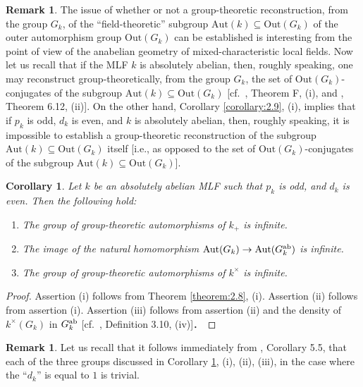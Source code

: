 \documentclass[11pt,showkeys]{article}
\theoremstyle{theorem}
\newtheorem{corollary}[theorem]{Corollary}
\theoremstyle{definition}
\newtheorem{remark}[theorem]{Remark}
\begin{document}
\begin{remark}\label{remark:2.11}
The issue of whether or not a group-theoretic 
reconstruction, from the group $G_k$, of the 
``field-theoretic'' subgroup $\mathrm{Aut}(k) \subseteq 
\mathrm{Out}(G_k)$ of the outer automorphism group 
$\mathrm{Out}(G_k)$ can be established is interesting 
from the point of view of the anabelian geometry of 
mixed-characteristic local fields.  Now let us recall 
that if the MLF $k$ is absolutely abelian, then, roughly 
speaking, one may reconstruct group-theoretically, from 
the group $G_k$, the set of $\mathrm{Out}(G_k)$-conjugates 
of the subgroup $\mathrm{Aut}(k) \subseteq 
\mathrm{Out}(G_k)$ [cf.\ \cite{Hoshi2}, Theorem F, (i), and 
\cite{Hoshi2}, Theorem 6.12, (ii)].  
On the other hand, Corollary \ref{corollary:2.9}, (i), implies that if 
$p_k$ is odd, $d_k$ is even, and $k$ is absolutely abelian, 
then, roughly speaking, it is impossible to establish a 
group-theoretic reconstruction of the subgroup 
$\mathrm{Aut}(k) \subseteq \mathrm{Out}(G_k)$ itself [i.e., 
as opposed to the set of $\mathrm{Out}(G_k)$-conjugates of the 
subgroup $\mathrm{Aut}(k) \subseteq \mathrm{Out}(G_k)$]. 
\end{remark}

\begin{corollary}\label{corollary:2.12}
Let $k$ be an absolutely abelian MLF such that $p_k$ is odd, and $d_k$ is even. Then the following hold: 
   \begin{enumerate}[label=(\arabic*),ref=(\arabic*)]
   	\item[\rm (i)] The group of group-theoretic automorphisms of $k_+$ is infinite. \label{colloraly:2.12:statement:1}
   	\item[\rm (ii)] The image of the natural homomorphism ${\rm Aut}(G_k) \to {\rm Aut}(G_k^{\rm ab})$ is infinite. \label{corollary:2.12:statement:2}
   	\item[\rm (iii)] The group of group-theoretic automorphisms of $k^\times$ is infinite. \label{corollary:2.12:statement:3}    
   \end{enumerate}
\end{corollary}
\begin{proof}
Assertion (i) follows from Theorem \ref{theorem:2.8}, (i). 
Assertion (ii) follows from assertion (i). 
Assertion (iii) follows from assertion (ii) and  the density of $k^\times(G_k)$ in $G_k^{\rm ab}$ [cf.\ \cite{Hoshi1}, Definition 3.10, (iv)]．
\end{proof}

\begin{remark}\label{remark:2.13}
Let us recall that it follows immediately from 
\cite{Hoshi2}, Corollary 5.5, that each of the three 
groups discussed in Corollary \ref{corollary:2.12}, 
(i), (ii), (iii), in the case where the ``$d_k$'' is
equal to $1$ is trivial.
\end{remark}
\end{document}
